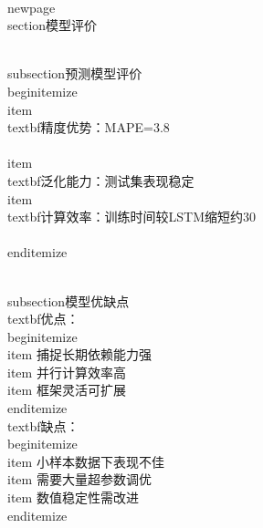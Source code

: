 \\newpage
\\section{模型评价}

\\subsection{预测模型评价}
\\begin{itemize}
    \\item \\textbf{精度优势}：MAPE=3.8\\%
    \\item \\textbf{泛化能力}：测试集表现稳定
    \\item \\textbf{计算效率}：训练时间较LSTM缩短约30\\%
\\end{itemize}

\\subsection{模型优缺点}
\\textbf{优点}：
\\begin{itemize}
    \\item 捕捉长期依赖能力强
    \\item 并行计算效率高
    \\item 框架灵活可扩展
\\end{itemize}
\\textbf{缺点}：
\\begin{itemize}
    \\item 小样本数据下表现不佳
    \\item 需要大量超参数调优
    \\item 数值稳定性需改进
\\end{itemize}
